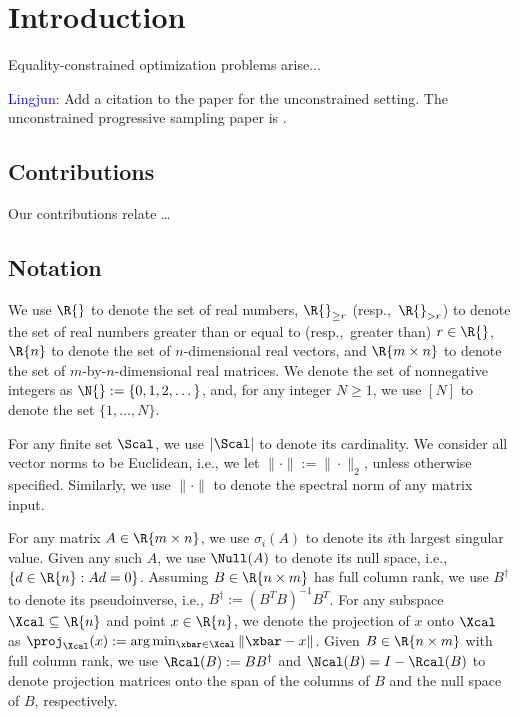 \section{Introduction}\label{sec.introduction}

Equality-constrained optimization problems arise...

\textcolor{blue}{Lingjun}: Add a citation to the paper for the unconstrained setting.
The unconstrained progressive sampling paper is \cite{mokhtari2019efficient}.
\subsection{Contributions}

Our contributions relate \dots

\subsection{Notation}

We use $\R{}$ to denote the set of real numbers, $\R{}_{\geq r}$ (resp.,~$\R{}_{>r}$) to denote the set of real numbers greater than or equal to (resp.,~greater than) $r \in \R{}$, $\R{n}$ to denote the set of $n$-dimensional real vectors, and $\R{m \times n}$ to denote the set of $m$-by-$n$-dimensional real matrices.  We denote the set of nonnegative integers as $\N{} := \{0,1,2,\dots\}$, and, for any integer $N \geq 1$, we use $[N]$ to denote the set $\{1, \dots, N\}$.

For any finite set $\Scal$, we use $|\Scal|$ to denote its cardinality.  We consider all vector norms to be Euclidean, i.e., we let $\|\cdot\| := \|\cdot\|_2$, unless otherwise specified.  Similarly, we use $\|\cdot\|$ to denote the spectral norm of any matrix input.

For any matrix $A \in \R{m \times n}$, we use $\sigma_i(A)$ to denote its $i$th largest singular value.  Given any such $A$, we use $\Null(A)$ to denote its null space, i.e., $\{d \in \R{n} : Ad = 0\}$.  Assuming $B \in \R{n \times m}$ has full column rank, we use $B^\dag$ to denote its pseudoinverse, i.e., $B^\dag := (B^TB)^{-1}B^T$.  For any subspace $\Xcal \subseteq \R{n}$ and point $x \in \R{n}$, we denote the projection of $x$ onto $\Xcal$ as $\proj_\Xcal(x) := \arg\min_{\xbar \in \Xcal} \|\xbar - x\|$.  Given $B \in \R{n \times m}$ with full column rank, we use $\Rcal(B) := BB^\dag$ and $\Ncal(B) = I - \Rcal(B)$ to denote projection matrices onto the span of the columns of $B$ and the null space of $B$, respectively.

